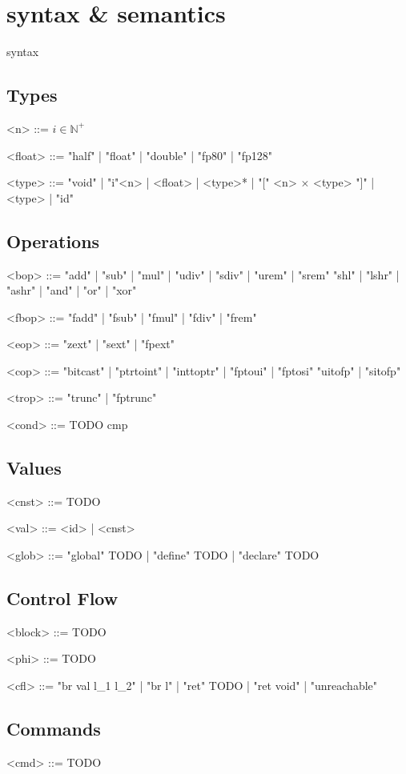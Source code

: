 \chapter{\llvm syntax \& semantics}
\label{ch:llvm}

\llvm syntax

\section{Types}
\begin{grammar}

<n> ::= $i \in \mathbb{N}^+$

<float> ::= "half" | "float" | "double" | "fp80" | "fp128"

<type> ::= "void" | "i"<n> | <float> | <type>* | "[" <n> $\times$ <type> "]" | { <type> } | "id"

\end{grammar}

\section{Operations}
\begin{grammar}
<bop> ::= "add" | "sub" | "mul" | "udiv" | "sdiv" | "urem" | "srem" \alt
          "shl" | "lshr" | "ashr" | "and" | "or" | "xor"

<fbop> ::= "fadd" | "fsub" | "fmul" | "fdiv" | "frem"

<eop>  ::= "zext" | "sext" | "fpext"

<cop>  ::= "bitcast" | "ptrtoint" | "inttoptr" | "fptoui" | "fptosi" \alt
           "uitofp"  | "sitofp"

<trop> ::= "trunc" | "fptrunc"

<cond> ::= TODO cmp
\end{grammar}

\section{Values}
\begin{grammar}
<cnst> ::= TODO

<val> ::= <id> | <cnst>

<glob> ::= "global" TODO | "define" TODO | "declare" TODO
\end{grammar}

\section{Control Flow}
\begin{grammar}
<block> ::= TODO

<phi> ::= TODO

<cfl> ::= "br val l_1 l_2" | "br l" | "ret" TODO | "ret void" | "unreachable"
\end{grammar}

\section{Commands}
\begin{grammar}
<cmd> ::= TODO
\end{grammar}
